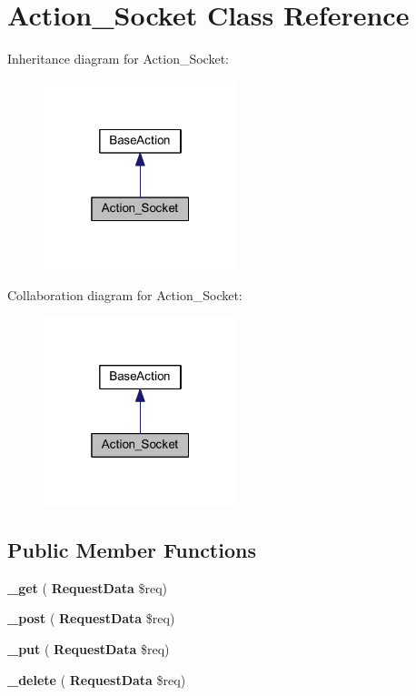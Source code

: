 \section{Action\+\_\+\+Socket Class Reference}
\label{class_lora_1_1_api_1_1_action___socket}


Inheritance diagram for Action\+\_\+\+Socket\+:\nopagebreak
\begin{figure}[H]
\begin{center}
\leavevmode
\includegraphics[width=160pt]{class_lora_1_1_api_1_1_action___socket__inherit__graph}
\end{center}
\end{figure}


Collaboration diagram for Action\+\_\+\+Socket\+:\nopagebreak
\begin{figure}[H]
\begin{center}
\leavevmode
\includegraphics[width=160pt]{class_lora_1_1_api_1_1_action___socket__coll__graph}
\end{center}
\end{figure}
\subsection*{Public Member Functions}
\begin{DoxyCompactItemize}
\item 
\mbox{\label{class_lora_1_1_api_1_1_action___socket_a3ad4bf1b146a3180b34d1327ff2abf69}} 
{\bfseries \+\_\+get} (\textbf{ Request\+Data} \$req)
\item 
\mbox{\label{class_lora_1_1_api_1_1_action___socket_a50751d47a139282d1c3b08cab1b6562e}} 
{\bfseries \+\_\+post} (\textbf{ Request\+Data} \$req)
\item 
\mbox{\label{class_lora_1_1_api_1_1_action___socket_a2affcc8f31c13147c33450193b229194}} 
{\bfseries \+\_\+put} (\textbf{ Request\+Data} \$req)
\item 
\mbox{\label{class_lora_1_1_api_1_1_action___socket_ab8ddc6de1e04524212f7d55893f78864}} 
{\bfseries \+\_\+delete} (\textbf{ Request\+Data} \$req)
\end{DoxyCompactItemize}
